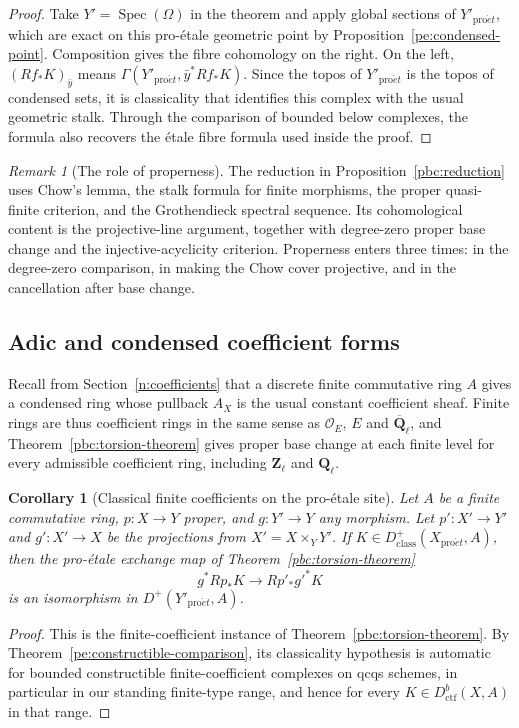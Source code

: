 \documentclass[11pt,a4paper]{article}
\numberwithin{equation}{section}
\newtheorem{corollary}[theorem]{Corollary}
\theoremstyle{definition}
\theoremstyle{remark}
\newtheorem{remark}[theorem]{Remark}
\newcommand{\Qbar}{\overline{\mathbf Q}_\ell}
\newcommand{\Ql}{\mathbf Q_\ell}
\newcommand{\Zl}{\mathbf Z_\ell}
\newcommand{\proet}{\mathrm{pro}\acute{e}t}
\newcommand{\Dctf}{D^b_{\mathrm{ctf}}}
\begin{document}
\begin{proof}
Take $Y'=\operatorname{Spec}(\Omega)$ in the theorem and apply
global sections of $Y'_{\proet}$, which are exact on this pro-\'etale
geometric point by Proposition~\ref{pe:condensed-point}. Composition
gives the fibre cohomology on the right. On the left,
$(Rf_*K)_{\bar y}$ means $\Gamma(Y'_{\proet},\bar y^*Rf_*K)$. Since
the topos of $Y'_{\proet}$ is the topos of condensed sets, it is
classicality that identifies this complex with the
usual geometric stalk. Through the comparison of bounded below
complexes, the formula
also recovers the \'etale fibre formula used inside the proof.
\end{proof}

\begin{remark}[The role of properness]\label{pbc:reduction-inputs}
The reduction in Proposition~\ref{pbc:reduction} uses Chow's lemma, the
stalk formula for finite morphisms, the proper quasi-finite criterion,
and the Grothendieck spectral sequence. Its cohomological content is
the projective-line argument, together with degree-zero proper base
change and the injective-acyclicity criterion. Properness enters three
times: in the degree-zero comparison, in making the Chow cover
projective, and in the cancellation after base change.
\end{remark}

\subsection{Adic and condensed coefficient forms}
\label{pbc:condensed}

Recall from Section~\ref{n:coefficients} that a discrete finite
commutative ring $A$ gives a condensed ring whose pullback $A_X$ is the
usual constant coefficient sheaf. Finite rings are thus coefficient
rings in the same sense as $\mathcal O_E$, $E$ and $\Qbar$, and
Theorem~\ref{pbc:torsion-theorem} gives proper base change at each
finite level for every admissible coefficient ring, including $\Zl$
and $\Ql$.

\begin{corollary}[Classical finite coefficients on the pro-\'etale site]
\label{pbc:proet-finite}
Let $A$ be a finite commutative ring, $p:X\to Y$ proper, and $g:Y'\to Y$ any
morphism. Let $p':X'\to Y'$ and $g':X'\to X$ be the projections from
$X'=X\times_Y Y'$. If $K\in D^+_{\mathrm{class}}(X_{\proet},A)$, then the
pro-\'etale exchange map of Theorem~\ref{pbc:torsion-theorem}
\[
 g^*Rp_*K\longrightarrow Rp'_*g'^*K
\]
is an isomorphism in $D^+(Y'_{\proet},A)$.
\end{corollary}
\begin{proof}
This is the finite-coefficient instance of
Theorem~\ref{pbc:torsion-theorem}. By
Theorem~\ref{pe:constructible-comparison}, its classicality hypothesis
is automatic for bounded constructible finite-coefficient complexes on
qcqs schemes, in particular in our standing finite-type range, and
hence for every $K\in\Dctf(X,A)$ in that range.
\end{proof}
\end{document}
